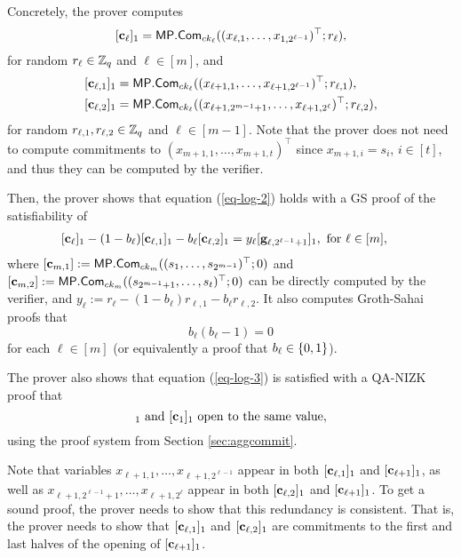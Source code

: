 Concretely, the prover computes
\begin{align*}
&[\mathbf{c}_\ell]_1=\mathsf{MP}.\mathsf{Com}_{ck_\ell}((x_{\ell,1},\ldots,x_{1,2^{\ell-1}})^\top;r_\ell),\\
\end{align*}
for random $r_\ell\in\mathbb{Z}_q$ and $\ell\in[m]$, and 
\begin{align*}
&[\mathbf{c}_{\ell,1}]_1=\mathsf{MP}.\mathsf{Com}_{ck_{\ell}}((x_{\ell+1,1},\ldots,x_{\ell+1,2^{\ell-1}})^\top;r_{\ell,1}),\\
&[\mathbf{c}_{\ell,2}]_1=\mathsf{MP}.\mathsf{Com}_{ck_{\ell}}((x_{\ell+1,2^{m-1}+1},\ldots,x_{\ell+1,2^\ell})^\top;r_{\ell,2}),\\
\end{align*}
for random $r_{\ell,1},r_{\ell,2}\in\mathbb{Z}_q$ and $\ell\in[m-1]$. Note that the prover does not need to compute commitments to $(x_{m+1,1},\ldots,x_{m+1,t})^\top$ since $x_{m+1,i}=s_i$, $i\in[t]$, and thus they can be computed by the verifier.

Then, the prover shows that equation (\ref{eq-log-2}) holds with a GS proof of
the satisfiability of
\begin{align}
&[\mathbf{c}_\ell]_1-(1-b_\ell)[\mathbf{c}_{\ell,1}]_1-b_\ell[\mathbf{c}_{\ell,2}]_1 = y_\ell[\mathbf{g}_{\ell,2^{\ell-1}+1}]_1, \text{ for } \ell \in[m],  \label{eq-log-5}
\end{align}
where $[\mathbf{c}_{m,1}]:=\mathsf{MP}.\mathsf{Com}_{ck_m}((s_1,\ldots,s_{2^{m-1}})^\top;0)$ and $[\mathbf{c}_{m,2}]:=\allowbreak \mathsf{MP}.\mathsf{Com}_{ck_m}(\allowbreak (s_{2^{m-1}+1},\allowbreak\ldots,s_{t})^\top;0)$ can be directly computed by the verifier, and $y_\ell:=r_\ell-(1-b_\ell)r_{\ell,1}-b_\ell r_{\ell,2}$. It also computes Groth-Sahai proofs that
\begin{equation}
b_\ell(b_\ell-1)=0 \label{eq-bit-gs}
\end{equation}
for each $\ell\in[m]$ (or equivalently a proof that $b_\ell\in\{0,1\}$).

The prover also shows that equation (\ref{eq-log-3}) is satisfied with a QA-NIZK proof that
\begin{equation}
[\vecb{c}]_1\text{ and }[\vecb{c}_1]_1\text{ open to the same value}, \label{eq-log-6}
\end{equation}
using the proof system from Section \ref{sec:aggcommit}.

Note that variables $x_{\ell+1,1},\ldots,x_{\ell+1,2^{\ell-1}}$ appear in both $[\mathbf{c}_{\ell,1}]_1$ and $[\mathbf{c}_{\ell+1}]_1$, as well as $x_{\ell+1,2^{\ell-1}+1},\ldots,x_{\ell+1,2^\ell}$ appear in both $[\mathbf{c}_{\ell,2}]_1$ and $[\mathbf{c}_{\ell+1}]_1$. To get a sound proof, the prover needs to show that this redundancy is consistent. That is, the prover needs to show that $[\mathbf{c}_{\ell,1}]_1$ and $[\mathbf{c}_{\ell,2}]_1$ are commitments to the first and last halves of the opening of $[\mathbf{c}_{\ell+1}]_1$.

